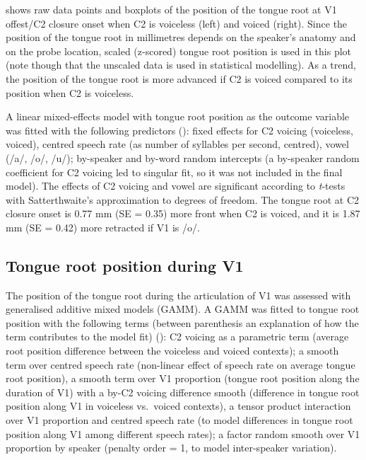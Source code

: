 \documentclass[preprint]{JASAnew}
\begin{document}
 shows raw data points and boxplots of the position of
the tongue root at V1 offest/C2 closure onset when C2 is voiceless
(left) and voiced (right). Since the position of the tongue root in
millimetres depends on the speaker's anatomy and on the probe location,
scaled (z-scored) tongue root position is used in this plot (note though
that the unscaled data is used in statistical modelling). As a trend,
the position of the tongue root is more advanced if C2 is voiced
compared to its position when C2 is voiceless.

A linear mixed-effects model with tongue root position as the outcome
variable was fitted with the following predictors
(): fixed effects for C2 voicing (voiceless,
voiced), centred speech rate (as number of syllables per second,
centred), vowel (/a/, /o/, /u/); by-speaker and by-word random
intercepts (a by-speaker random coefficient for C2 voicing led to
singular fit, so it was not included in the final model). The effects of
C2 voicing and vowel are significant according to \emph{t}-tests with
Satterthwaite's approximation to degrees of freedom. The tongue root at
C2 closure onset is 0.77 mm (SE = 0.35) more front when C2 is voiced,
and it is 1.87 mm (SE = 0.42) more retracted if V1 is /o/.

\hypertarget{tongue-root-position-during-v1}{%
\subsection{Tongue root position during
V1}\label{tongue-root-position-during-v1}}

\label{s:trp-v1}

The position of the tongue root during the articulation of V1 was
assessed with generalised additive mixed models (GAMM). A GAMM was
fitted to tongue root position with the following terms (between
parenthesis an explanation of how the term contributes to the model fit)
(): C2 voicing as a parametric term (average
root position difference between the voiceless and voiced contexts); a
smooth term over centred speech rate (non-linear effect of speech rate
on average tongue root position), a smooth term over V1 proportion
(tongue root position along the duration of V1) with a by-C2 voicing
difference smooth (difference in tongue root position along V1 in
voiceless vs.~voiced contexts), a tensor product interaction over V1
proportion and centred speech rate (to model differences in tongue root
position along V1 among different speech rates); a factor random smooth
over V1 proportion by speaker (penalty order = 1, to model inter-speaker
variation).
\end{document}
